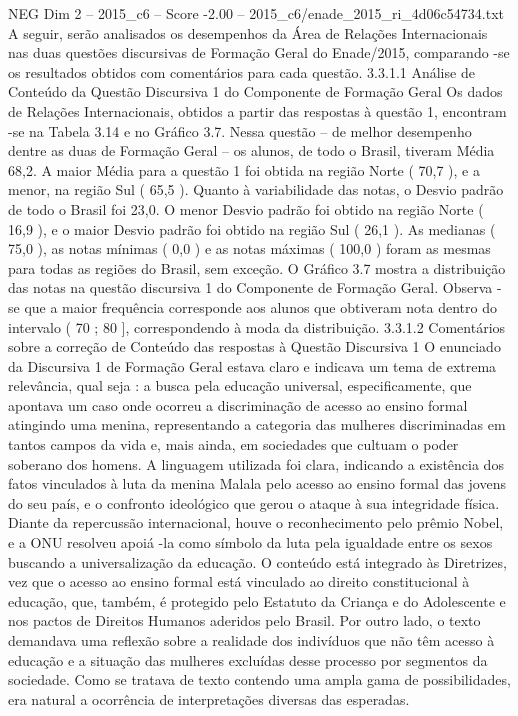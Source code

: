 \begin{textsample}{NEG Dim 2 – 2015\_c6 – Score -2.00 – 2015\_c6/enade\_2015\_ri\_4d06c54734.txt}
A seguir, serão analisados os desempenhos da Área de Relações Internacionais nas duas questões discursivas de Formação Geral do Enade/2015, comparando -se os resultados obtidos com comentários para cada questão. 3.3.1.1 Análise de Conteúdo da Questão Discursiva 1 do Componente de Formação Geral Os dados de Relações Internacionais, obtidos a partir das respostas à questão 1, encontram -se na Tabela 3.14 e no Gráfico 3.7.
Nessa questão – de melhor desempenho dentre as duas de Formação Geral – os alunos, de todo o Brasil, tiveram Média 68,2.
A maior Média para a questão 1 foi obtida na região Norte ( 70,7 ), e a menor, na região Sul ( 65,5 ).
Quanto à variabilidade das notas, o Desvio padrão de todo o Brasil foi 23,0.
O menor Desvio padrão foi obtido na região Norte ( 16,9 ), e o maior Desvio padrão foi obtido na região Sul ( 26,1 ).
As medianas ( 75,0 ), as notas mínimas ( 0,0 ) e as notas máximas ( 100,0 ) foram as mesmas para todas as regiões do Brasil, sem exceção.
O Gráfico 3.7 mostra a distribuição das notas na questão discursiva 1 do Componente de Formação Geral.
Observa -se que a maior frequência corresponde aos alunos que obtiveram nota dentro do intervalo ( 70 ; 80 ], correspondendo à moda da distribuição. 3.3.1.2 Comentários sobre a correção de Conteúdo das respostas à Questão Discursiva 1 O enunciado da Discursiva 1 de Formação Geral estava claro e indicava um tema de extrema relevância, qual seja : a busca pela educação universal, especificamente, que apontava um caso onde ocorreu a discriminação de acesso ao ensino formal atingindo uma menina, representando a categoria das mulheres discriminadas em tantos campos da vida e, mais ainda, em sociedades que cultuam o poder soberano dos homens.
A linguagem utilizada foi clara, indicando a existência dos fatos vinculados à luta da menina Malala pelo acesso ao ensino formal das jovens do seu país, e o confronto ideológico que gerou o ataque à sua integridade física.
Diante da repercussão internacional, houve o reconhecimento pelo prêmio Nobel, e a ONU resolveu apoiá -la como símbolo da luta pela igualdade entre os sexos buscando a universalização da educação.
O conteúdo está integrado às Diretrizes, vez que o acesso ao ensino formal está vinculado ao direito constitucional à educação, que, também, é protegido pelo Estatuto da Criança e do Adolescente e nos pactos de Direitos Humanos aderidos pelo Brasil.
Por outro lado, o texto demandava uma reflexão sobre a realidade dos indivíduos que não têm acesso à educação e a situação das mulheres excluídas desse processo por segmentos da sociedade.
Como se tratava de texto contendo uma ampla gama de possibilidades, era natural a ocorrência de interpretações diversas das esperadas.

\end{textsample}
